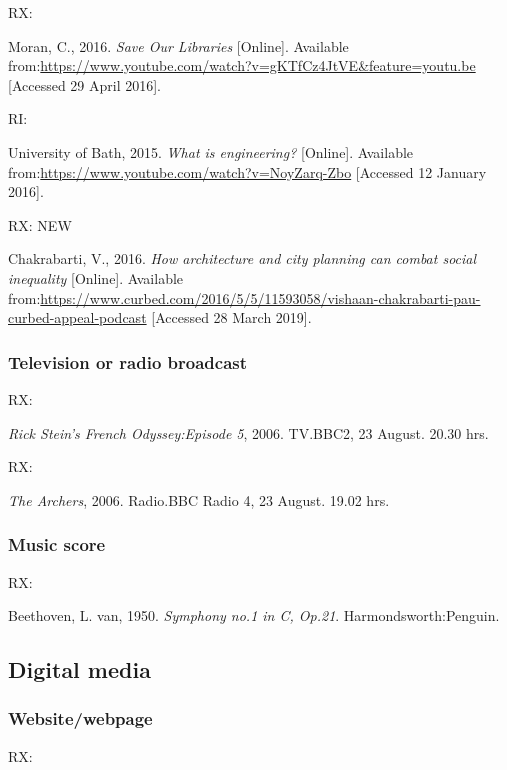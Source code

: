 RX: \cite{moran2016sol}

Moran, C., 2016. \emph{Save Our Libraries} [Online]. Available from:\@ \url{https://www.youtube.com/watch?v=gKTfCz4JtVE&feature=youtu.be} [Accessed 29 April 2016].


RI: \cite{uob2015wie}

University of Bath, 2015. \emph{What is engineering?} [Online]. Available from:\@ \url{https://www.youtube.com/watch?v=NoyZarq-Zbo} [Accessed 12 January 2016].


RX: \cite{chakrabarti2016hac} NEW

Chakrabarti, V., 2016. \emph{How architecture and city planning can combat social inequality} [Online]. Available from:\@ \url{https://www.curbed.com/2016/5/5/11593058/vishaan-chakrabarti-pau-curbed-appeal-podcast} [Accessed 28 March 2019].



\subsubsection*{Television or radio broadcast}

RX: \cite{rsfo2006ep5}

\emph{Rick Stein's French Odyssey:\@ Episode 5}, 2006. TV.\@ BBC2, 23 August. 20.30 hrs.


RX: \cite{archers20060823}

\emph{The Archers}, 2006. Radio.\@ BBC Radio 4, 23 August. 19.02 hrs.



\subsubsection*{Music score}

RX: \cite{beethoven1950symph1}

Beethoven, L. van, 1950. \emph{Symphony no.1 in C, Op.21}. Harmondsworth:\@ Penguin.



\subsection{Digital media}

\subsubsection*{Website\slash webpage}

RX: \cite{holland2002gci}

